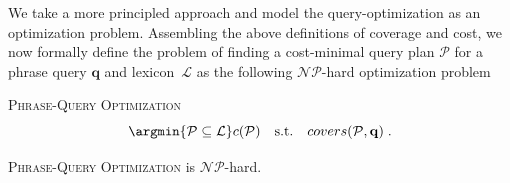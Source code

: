 We take a more principled approach and model the query-optimization as an optimization problem. Assembling the above definitions of coverage and cost, we now formally
define the problem of finding a cost-minimal query plan $\mathcal{P}$
for a phrase query $\mathbf{q}$ and lexicon~$\mathcal{L}$ as the
following $\mathcal{NP}$-hard optimization problem
\begin{definition}{\textsc{Phrase-Query Optimization}}
$$
  \argmin{\mathcal{P} \subseteq \mathcal{L}} c(\mathcal{P}) \quad\mbox{s.t.}\quad covers(\mathcal{P},\mathbf{q}) \;.
$$


\end{definition}
\begin{theorem}{}
\label{thm:PQONP} 
 \textsc{Phrase-Query Optimization} is $\mathcal{NP}$-hard.
\end{theorem} 

